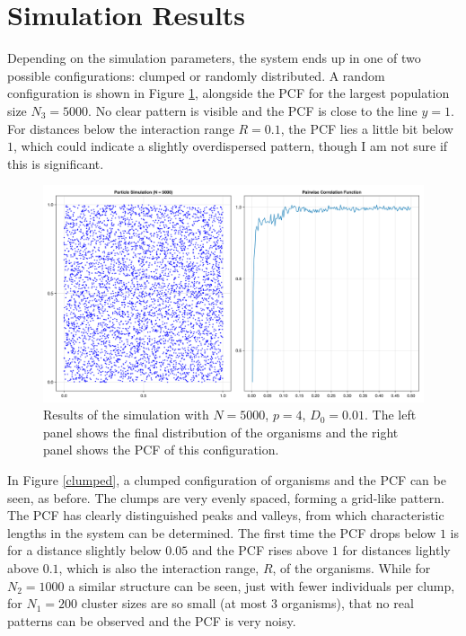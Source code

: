 \documentclass{article}
\begin{document}
\section{Simulation Results} 
Depending on the simulation parameters, the system ends up in one of two possible configurations: clumped or randomly distributed.
A random configuration is shown in Figure \ref{random}, alongside the PCF for the largest population size $N_3=5000$. 
No clear pattern is visible and the PCF is close to the line $y=1$.
For distances below the interaction range $R=0.1$, the PCF lies a little bit below $1$, which could indicate a slightly overdispersed pattern, though I am not sure if this is significant.
\begin{figure}
    \label{random}
    \includegraphics[width=1.0\linewidth]{img/rp151_N5000_D01_p4.png}
    \caption{Results of the simulation with $N=5000$, $p=4$, $D_0=0.01$. The left panel shows the final distribution of the organisms and the right panel shows the PCF of this configuration.}
\end{figure}
In Figure \ref{clumped}, a clumped configuration of organisms and the PCF can be seen, as before.
The clumps are very evenly spaced, forming a grid-like pattern. 
The PCF has clearly distinguished peaks and valleys, from which characteristic lengths in the system can be determined.
The first time the PCF drops below $1$ is for a distance slightly below $0.05$ and the PCF rises above $1$ for distances lightly above $0.1$, which is also the interaction range, $R$, of the organisms.
While for $N_2=1000$ a similar structure can be seen, just with fewer individuals per clump, for $N_1=200$ cluster sizes are so small (at most $3$ organisms), that no real patterns can be observed and the PCF is very noisy.
\end{document}

